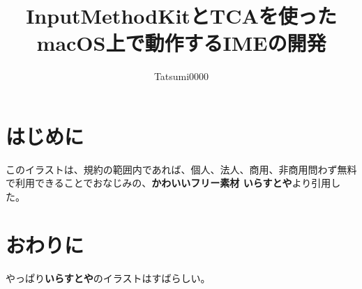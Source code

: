 \documentclass[uplatex,a4j,12pt]{jsarticle}
\begin{document}
\title{\vspace{-10mm}InputMethodKitとTCAを使ったmacOS上で動作するIMEの開発}
\author{Tatsumi0000}
\date{}
\maketitle


\section{はじめに}

このイラストは、規約の範囲内であれば、個人、法人、商用、非商用問わず無料で利用できることでおなじみの、{\bf かわいいフリー素材 いらすとや}\cite{Hoge}より引用した。

\section{おわりに}
やっぱり{\bf いらすとや}のイラストはすばらしい。

 
 
\end{document}

